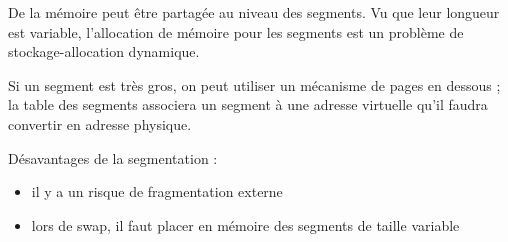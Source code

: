 De la mémoire peut être partagée au niveau des segments. Vu que leur longueur est variable, l'allocation de mémoire pour les segments est un problème de stockage-allocation dynamique.


Si un segment est très gros, on peut utiliser un mécanisme de pages en dessous ; la table des segments associera un segment à une adresse virtuelle qu'il faudra convertir en adresse physique.

Désavantages de la segmentation :

\begin{itemize}
	\item il y a un risque de fragmentation externe
	\item lors de swap, il faut placer en mémoire des segments de taille variable
\end{itemize}